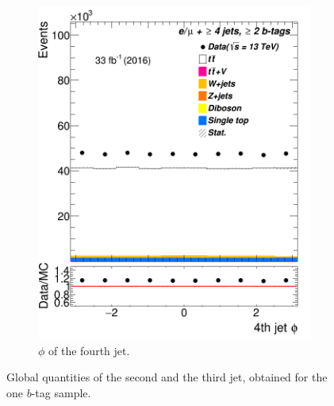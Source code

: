 \begin{figure}
\begin{subfigure}{0.25\textwidth}
	\includegraphics[width=\linewidth]{ControlPlots_emujets_2016_4incl_2incl/jet3_phi_emujets_2016.png}
	\caption{$\phi$ of the fourth jet.} \label{fig:4dd}
\end{subfigure}


\caption{Global quantities of the second and the third jet, obtained for the one $b$-tag sample.}
\end{figure}	




